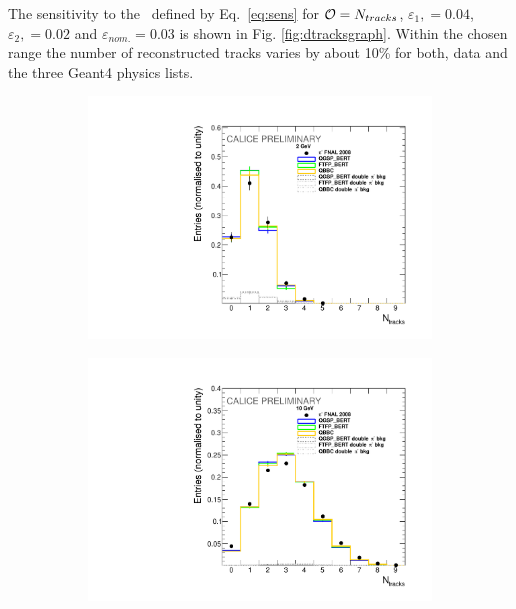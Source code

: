 The sensitivity to the \ep\ defined by Eq.~\ref{eq:sens} for ${\cal O}=N_{tracks}$, $\varepsilon_{1},=0.04$, $\varepsilon_{2},=0.02$ and $\varepsilon_{nom.}=0.03$   
is shown in Fig. \ref{fig:dtracksgraph}. Within the chosen range the number of reconstructed tracks varies by about 10\% for both, data and the three {\sc Geant4} physics lists. 
\begin{figure}
	\centering
	\begin{subfigure}{0.5\textwidth}
		\centering
		\includegraphics[width=.90\linewidth]{ECAL/plots/ntracks-2.pdf}
		\caption{\label{fig:tr2} }
	\end{subfigure}%
	\begin{subfigure}{0.5\textwidth}
		\centering
		\includegraphics[width=.90\linewidth]{ECAL/plots/ntracks-10.pdf}

\end{subfigure}
\end{figure}

